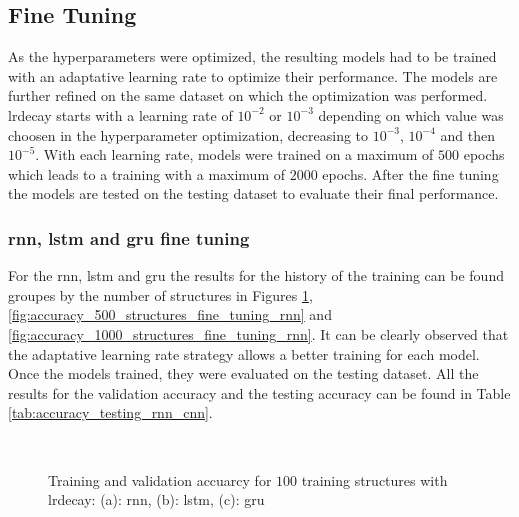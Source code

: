 \documentclass[conference]{IEEEtran}
\begin{document}
\subsection{Fine Tuning}

As the hyperparameters were optimized, the resulting models had to be trained with an adaptative learning rate to optimize their performance. The models are further refined on the same dataset on which the optimization was performed. \gls{lrdecay} starts with a learning rate of $10^{-2}$ or $10^{-3}$ depending on which value was choosen in the hyperparameter optimization, decreasing to $10^{-3}$, $10^{-4}$ and then $10^{-5}$. With each learning rate, models were trained on a maximum of $ 500 $ epochs which leads to a training with a maximum of $ 2 000 $ epochs. After the fine tuning the models are tested on the testing dataset to evaluate their final performance.

\subsubsection{\gls{rnn}, \gls{lstm} and \gls{gru} fine tuning}

For the \gls{rnn}, \gls{lstm} and \gls{gru} the results for the history of the training can be found groupes by the number of structures in Figures \ref{fig:accuracy_100_structures_fine_tuning_rnn}, \ref{fig:accuracy_500_structures_fine_tuning_rnn} and \ref{fig:accuracy_1000_structures_fine_tuning_rnn}. It can be clearly observed that the adaptative learning rate strategy allows a better training for each model. Once the models trained, they were evaluated on the testing dataset. All the results for the validation accuracy and the testing accuracy can be found in Table \ref{tab:accuracy_testing_rnn_cnn}.  

\begin{figure}[htp]
	\centering
	\quad
	\\
	\caption{Training and validation accuarcy for $ 100 $ training structures with \gls{lrdecay}: (a): \gls{rnn}, (b): \gls{lstm}, (c): \gls{gru}}
	\label{fig:accuracy_100_structures_fine_tuning_rnn}
\end{figure}
\end{document}
